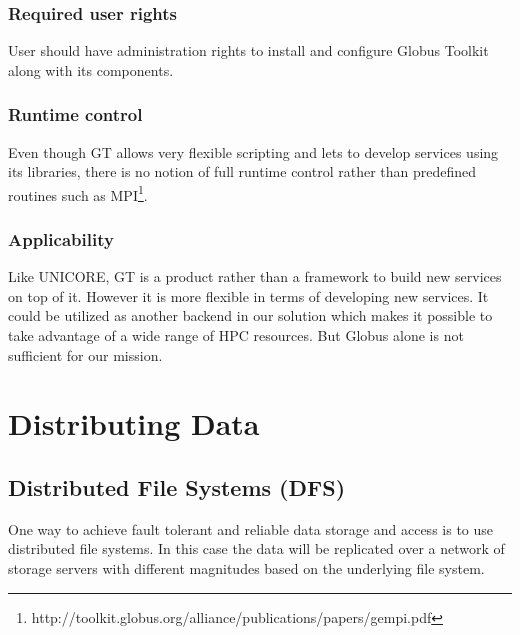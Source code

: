 \subsubsection {Required user rights}
User should have administration rights to install and configure Globus Toolkit along with its components.
\subsubsection {Runtime control}
Even though GT allows very flexible scripting and lets to develop services using its libraries, there is no notion
of full runtime control rather than predefined routines such 
as MPI\footnote{http://toolkit.globus.org/alliance/publications/papers/gempi.pdf}.
\subsubsection {Applicability}
Like UNICORE, GT is a product rather than a framework to build new services on top of it. However it is more flexible
in terms of developing new services. It could be utilized as another backend in our solution which makes it
possible to take advantage of a wide range of HPC resources. But Globus alone is not sufficient for 
our mission.

\section{Distributing Data}

\subsection{Distributed File Systems (DFS)}
One way to achieve fault tolerant and reliable data storage and access is to use
distributed file systems. In this case the data will be replicated over a
network of storage servers with different magnitudes based on the underlying file
system.

